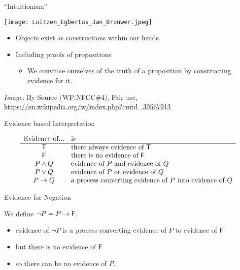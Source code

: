 \documentclass[xetex,aspectratio=169,14pt,hyperref={pdfpagelabels=true,pdflang={en-GB}}]{beamer}
\begin{document}
\begin{frame}
  {``Intuitionism''}

  \begin{center}
    \texttt{[image: Luitzen\_Egbertus\_Jan\_Brouwer.jpeg]}
  \end{center}

  \begin{itemize}
  \item Objects exist as constructions within our heads.
  \item Including proofs of propositions
    \begin{itemize}
    \item We convince ourselves of the truth of a proposition by
      constructing evidence for it.
    \end{itemize}
  \end{itemize}

  {\tiny
  \emph{Image: }By Source (WP:NFCC\#4), Fair use, \url{https://en.wikipedia.org/w/index.php?curid=39567913}}
\end{frame}

\begin{frame}
  {Evidence based Interpretation}

  \begin{displaymath}
    \begin{array}{cl}
      \textrm{Evidence of...}&\textrm{is}\\
      \hline
      \mathsf{T} &\textrm{there always evidence of $\mathsf{T}$} \\
      \mathsf{F}&\textrm{there is no evidence of $\mathsf{F}$} \\
      P \land Q&\textrm{evidence of $P$ and evidence of $Q$} \\
      P \lor Q &\textrm{evidence of $P$ or  evidence of $Q$} \\
      P \to Q  &\textrm{a process converting evidence of $P$ into evidence of $Q$}
    \end{array}
  \end{displaymath}
\end{frame}

\begin{frame}
  {Evidence for Negation}

  We define $\lnot P = P \to \mathsf{F}$.
  \begin{itemize}
  \item evidence of $\lnot P$ is a process converting evidence of $P$ to evidence of $\mathsf{F}$
  \item but there is no evidence of $\mathsf{F}$
  \item so there can be no evidence of $P$.
  \end{itemize}
\end{frame}
\end{document}
